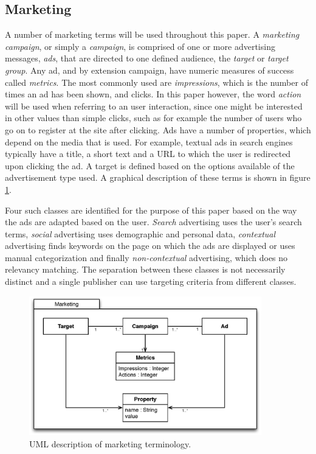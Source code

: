 \documentclass[10pt,twocolumn]{article}
\begin{document}
\subsection{Marketing}
A number of marketing terms will be used throughout this paper. A \emph{marketing campaign}, or simply a \emph{campaign}, is comprised of one or more advertising messages, \emph{ads}, that are directed to one defined audience, the \emph{target} or \emph{target group}. Any ad, and by extension campaign, have numeric measures of success called \emph{metrics}. The most commonly used are \emph{impressions}, which is the number of times an ad has been shown, and clicks. In this paper however, the word \emph{action} will be used when referring to an user interaction, since one might be interested in other values than simple clicks, such as for example the number of users who go on to register at the site after clicking. Ads have a number of properties, which depend on the media that is used. For example, textual ads in search engines typically have a title, a short text and a URL to which the user is redirected upon clicking the ad. A target is defined based on the options available of the advertisement type used. A graphical description of these terms is shown in figure \ref{fig:MarketingTerminology}.

Four such classes are identified for the purpose of this paper based on the way the ads are adapted based on the user. \emph{Search} advertising uses the user's search terms, \emph{social} advertising uses demographic and personal data, \emph{contextual} advertising finds keywords on the page on which the ads are displayed or uses manual categorization and finally \emph{non-contextual} advertising, which does no relevancy matching. The separation between these classes is not necessarily distinct and a single publisher can use targeting criteria from different classes.

\begin{figure}[htb] \centering \includegraphics[width=0.9\textwidth]{marketing-uml.eps}
	\caption{UML description of marketing terminology.}
	\label{fig:MarketingTerminology}
\end{figure}
\end{document}
